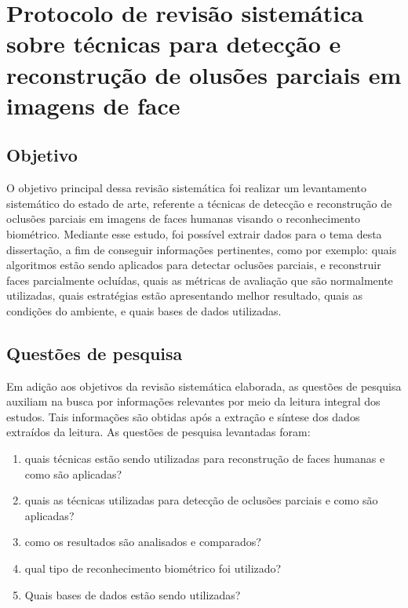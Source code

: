 
\chapter{Protocolo de revisão sistemática sobre técnicas para detecção e reconstrução de olusões parciais em imagens de face}
\label{apen2:RS}

\section{Objetivo}



O objetivo principal dessa revisão sistemática foi realizar um levantamento sistemático do estado de arte, referente a técnicas de detecção e reconstrução de oclusões parciais em imagens de faces humanas visando o reconhecimento biométrico. Mediante esse estudo, foi possível extrair dados para o tema desta dissertação, a fim de conseguir informações pertinentes, como por exemplo: quais algoritmos estão sendo aplicados para detectar oclusões parciais, e reconstruir faces parcialmente ocluídas, quais as métricas de avaliação que são normalmente utilizadas, quais estratégias estão apresentando melhor resultado, quais as condições do ambiente, e quais bases de dados utilizadas.


\section{Questões de pesquisa}
Em adição aos objetivos da revisão sistemática elaborada, as questões de pesquisa auxiliam na busca por informações relevantes por meio da leitura integral dos estudos. Tais informações são obtidas após a extração e síntese dos dados extraídos da leitura. As questões de pesquisa levantadas foram:

\begin{enumerate}
\item quais técnicas estão sendo utilizadas para reconstrução de faces humanas e como são aplicadas?	
\item quais as técnicas utilizadas para detecção de oclusões parciais e como são aplicadas?
 \item como os resultados são analisados e comparados?
 \item qual tipo de reconhecimento biométrico foi utilizado?\item Quais bases de dados estão sendo utilizadas?
\end{enumerate}

